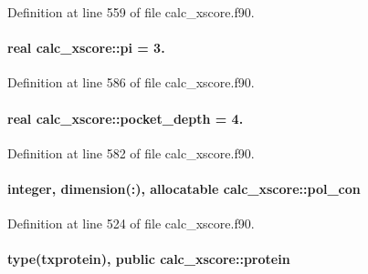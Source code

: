Definition at line 559 of file calc\-\_\-xscore.\-f90.

\hypertarget{classcalc__xscore_a4fab50dc764bf59bedef759a3a262de1}{
\paragraph[{pi}]{\setlength{\rightskip}{0pt plus 5cm}real calc\-\_\-xscore\-::pi = 3.}}\label{classcalc__xscore_a4fab50dc764bf59bedef759a3a262de1}


Definition at line 586 of file calc\-\_\-xscore.\-f90.

\hypertarget{classcalc__xscore_af609b9596ea420562a73357a122f5469}{
\paragraph[{pocket\-\_\-depth}]{\setlength{\rightskip}{0pt plus 5cm}real calc\-\_\-xscore\-::pocket\-\_\-depth = 4.}}\label{classcalc__xscore_af609b9596ea420562a73357a122f5469}


Definition at line 582 of file calc\-\_\-xscore.\-f90.

\hypertarget{classcalc__xscore_a912319de67f79eb8a37652c5226ec7fc}{
\paragraph[{pol\-\_\-con}]{\setlength{\rightskip}{0pt plus 5cm}integer, dimension(\-:), allocatable calc\-\_\-xscore\-::pol\-\_\-con}}\label{classcalc__xscore_a912319de67f79eb8a37652c5226ec7fc}


Definition at line 524 of file calc\-\_\-xscore.\-f90.

\hypertarget{classcalc__xscore_a98803b585e24ba9794bf16dc263374dc}{
\paragraph[{protein}]{\setlength{\rightskip}{0pt plus 5cm}type({\bf txprotein}), public calc\-\_\-xscore\-::protein}}\label{classcalc__xscore_a98803b585e24ba9794bf16dc263374dc}


